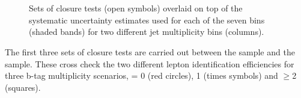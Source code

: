 \begin{figure}[h!]
  \begin{center}
     \\
     ~~
     \\
    \caption{Sets of closure tests (open symbols) overlaid on top of
      the systematic uncertainty estimates used for each of the seven
      \scalht bins (shaded bands) for two different jet multiplicity bins (columns).}
    \label{fig:closure}
  \end{center} 
\end{figure}

The first three sets of closure tests are carried out between the \mj
sample and the \ej sample. These cross check the two different lepton
identification efficiencies for three b-tag multiplicity scenarios,
\njet = 0 (red circles), 1 (times symbols) and $\geq$2 (squares).

